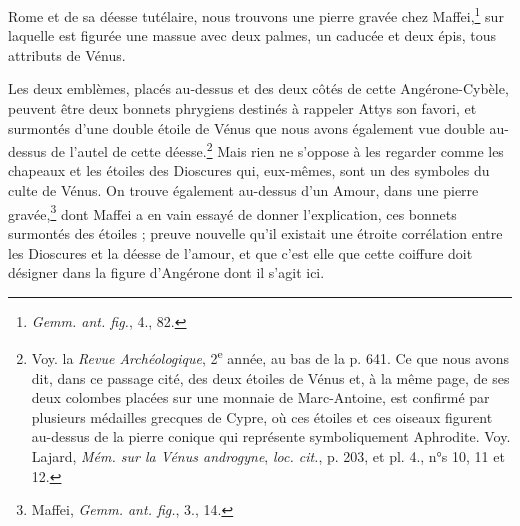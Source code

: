\documentclass[a4paper, 11pt, oneside, polutonikogreek, french]{article}
\begin{document}
Rome et de sa déesse tutélaire, nous trouvons une pierre gravée chez Maffei,\footnote{\emph{Gemm. ant. fig.}, 4., 82.} sur laquelle est figurée une massue avec deux palmes, un caducée et deux épis, tous attributs de Vénus.

Les deux emblèmes, placés au-dessus et des deux côtés de cette Angérone-Cybèle, peuvent être deux bonnets phrygiens destinés à rappeler Attys son favori, et surmontés d'une double étoile de Vénus que nous avons également vue double au-dessus de l'autel de cette déesse.\footnote{Voy. la \emph{Revue Archéologique}, 2\textsuperscript{e} année, au bas de la p. 641. Ce que nous avons dit, dans ce passage cité, des deux étoiles de Vénus et, à la même page, de ses deux colombes placées sur une monnaie de Marc-Antoine, est confirmé par plusieurs médailles grecques de Cypre, où ces étoiles et ces oiseaux figurent au-dessus de la pierre conique qui représente symboliquement Aphrodite. Voy. Lajard, \emph{Mém. sur la Vénus androgyne}, \emph{loc. cit.}, p. 203, et pl. 4., n°s 10, 11 et 12.} Mais rien ne s'oppose à les regarder comme les chapeaux et les étoiles des Dioscures qui, eux-mêmes, sont un des symboles du culte de Vénus. On trouve également au-dessus d'un Amour, dans une pierre gravée,\footnote{Maffei, \emph{Gemm. ant. fig.}, 3., 14.} dont Maffei a en vain essayé de donner l'explication, ces bonnets surmontés des étoiles ; preuve nouvelle qu'il existait une étroite corrélation entre les Dioscures et la déesse de l'amour, et que c'est elle que cette coiffure doit désigner dans la figure d'Angérone dont il s'agit ici.
\end{document}
